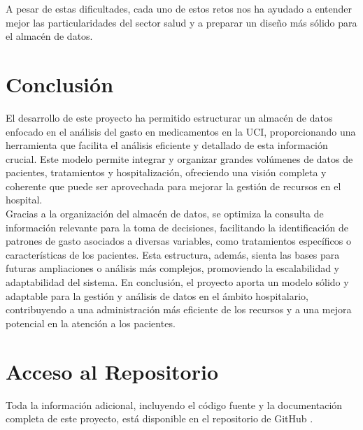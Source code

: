 \documentclass{article}
\begin{document}
A pesar de estas dificultades, cada uno de estos retos nos ha ayudado a entender mejor las particularidades del sector salud y a preparar un diseño más sólido para el almacén de datos.
\section{Conclusión}
\label{sec:conclusion}


El desarrollo de este proyecto ha permitido estructurar un almacén de datos enfocado en el análisis del gasto en medicamentos en la UCI, proporcionando una herramienta que facilita el análisis eficiente y detallado de esta información crucial. Este modelo permite integrar y organizar grandes volúmenes de datos de pacientes, tratamientos y hospitalización, ofreciendo una visión completa y coherente que puede ser aprovechada para mejorar la gestión de recursos en el hospital.
\\

Gracias a la organización del almacén de datos, se optimiza la consulta de información relevante para la toma de decisiones, facilitando la identificación de patrones de gasto asociados a diversas variables, como tratamientos específicos o características de los pacientes. Esta estructura, además, sienta las bases para futuras ampliaciones o análisis más complejos, promoviendo la escalabilidad y adaptabilidad del sistema. En conclusión, el proyecto aporta un modelo sólido y adaptable para la gestión y análisis de datos en el ámbito hospitalario, contribuyendo a una administración más eficiente de los recursos y a una mejora potencial en la atención a los pacientes.

\newpage
\section{Acceso al Repositorio}

Toda la información adicional, incluyendo el código fuente y la documentación completa de este proyecto, está disponible en el repositorio de GitHub \cite{silva2024github}.

\end{document}
